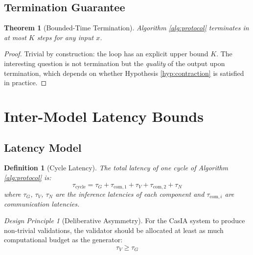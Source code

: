 \documentclass[11pt,a4paper]{article}
\newtheorem{definition}{Definition}[section]
\newtheorem{theorem}{Theorem}[section]
\theoremstyle{remark}
\newtheorem{principle}{Design Principle}[section]
\begin{document}
\subsection{Termination Guarantee}

\begin{theorem}[Bounded-Time Termination]
\label{thm:termination}
Algorithm \ref{alg:protocol} terminates in at most $K$ steps for any input $x$.
\end{theorem}

\begin{proof}
Trivial by construction: the loop has an explicit upper bound $K$. The interesting question is not termination but the \emph{quality} of the output upon termination, which depends on whether Hypothesis \ref{hyp:contraction} is satisfied in practice.
\end{proof}

\section{Inter-Model Latency Bounds}
\label{sec:latency}

\subsection{Latency Model}

\begin{definition}[Cycle Latency]
\label{def:latency}
The total latency of one cycle of Algorithm \ref{alg:protocol} is:
\begin{equation}
  \tau_{\text{cycle}} = \tau_G + \tau_{\text{com},1} + \tau_V + \tau_{\text{com},2} + \tau_N
\end{equation}
where $\tau_G$, $\tau_V$, $\tau_N$ are the inference latencies of each component and $\tau_{\text{com},i}$ are communication latencies.
\end{definition}

\begin{principle}[Deliberative Asymmetry]
\label{princ:asymmetry}
For the CasIA system to produce non-trivial validations, the validator should be allocated at least as much computational budget as the generator:
\begin{equation}
  \tau_V \geq \tau_G
\end{equation}
\end{principle}
\end{document}
